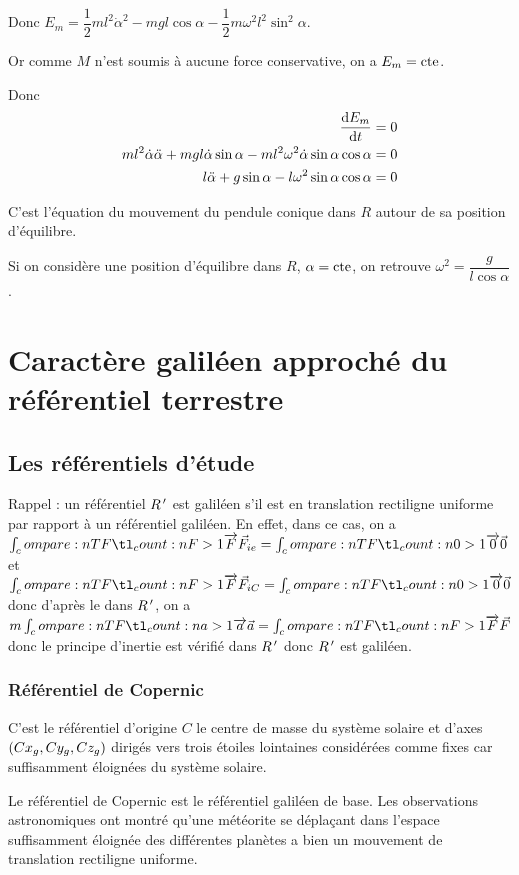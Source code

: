 Donc \(E_m=\dfrac{1}{2}ml^2\dot{\alpha}^2-mgl\cos\alpha-\dfrac{1}{2}m\omega^2l^2\sin^2\alpha\).

Or comme \(M\) n'est soumis à aucune force conservative, on a \(E_m=\mathrm{cte}\).

Donc \[\begin{aligned}
\odv{E_m}{t}&=0 \\
ml^2\dot{\alpha}\ddot{\alpha}+mgl\dot{\alpha}\sin\alpha-ml^2\omega^2\dot{\alpha}\sin\alpha\cos\alpha&=0 \\
l\ddot{\alpha}+g\sin\alpha-l\omega^2\sin\alpha\cos\alpha&=0
\end{aligned}\]

C'est l'équation du mouvement du pendule conique dans \(R\) autour de sa position d'équilibre.

Si on considère une position d'équilibre dans \(R\), \ie \(\alpha=\mathrm{cte}\), on retrouve \(\omega^2=\dfrac{g}{l\cos\alpha}\).

\section{Caractère galiléen approché du référentiel terrestre}

\subsection{Les référentiels d'étude}

Rappel : un référentiel \(R^{\,\prime}\) est galiléen s'il est en translation rectiligne uniforme par rapport à un référentiel galiléen. En effet, dans ce cas, on a \(\v{F}_{ie}=\v{0}\) et \(\v{F}_{iC}=\v{0}\) donc d'après le \PFD dans \(R^{\,\prime}\), on a \(m\v{a}=\v{F}\) donc le principe d'inertie est vérifié dans \(R^{\,\prime}\) donc \(R^{\,\prime}\) est galiléen.

\subsubsection{Référentiel de Copernic}

C'est le référentiel d'origine \(C\) le centre de masse du système solaire et d'axes \(\left(Cx_g,Cy_g,Cz_g\right)\) dirigés vers trois étoiles lointaines considérées comme fixes car suffisamment éloignées du système solaire.

Le référentiel de Copernic est le référentiel galiléen de base. Les observations astronomiques ont montré qu'une météorite se déplaçant dans l'espace suffisamment éloignée des différentes planètes a bien un mouvement de translation rectiligne uniforme.

